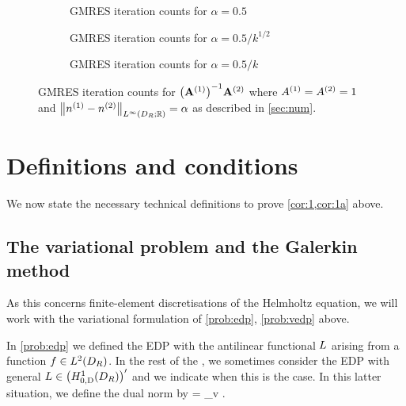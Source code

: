   \begin{figure}
    \centering
    \begin{subfigure}{\textwidth}
      \centering

\caption{GMRES iteration counts for $\alpha = 0.5$}\label{fig:linfinityn0}
    \end{subfigure}
    
    \begin{subfigure}{\textwidth}
      \centering

  \caption{GMRES iteration counts for $\alpha = 0.5/k^{1/2}$}\label{fig:linfinityn1}
\end{subfigure}

    \begin{subfigure}{\textwidth}
      \centering

  \caption{GMRES iteration counts for $\alpha = 0.5/k$}\label{fig:linfinityn2}
\end{subfigure}
\caption{GMRES iteration counts for $\AmatoI\Amatt$ where ${A}^{(1)}={A}^{(2)}=1$ and $\NLiDRRR{\nso-\nst} = \alpha$ as described in \cref{sec:num}.}
\end{figure}
  



\section{Definitions and conditions}\label{sec:3}

We now state the necessary technical definitions to prove \cref{cor:1,cor:1a} above.

\subsection{The variational problem and the Galerkin method}\label{sec:vpGm}
As this  concerns finite-element discretisations of the Helmholtz equation, we will work with the variational formulation of \cref{prob:edp}, \cref{prob:vedp} above.

In \cref{prob:edp} we defined the EDP with the antilinear functional $L$ arising from a function $f\in \LtDR$. In the rest of the , 
we sometimes consider the EDP with general $\LE\in \HozDDRp$ and we indicate when this is the case.
In this latter situation, we define the dual norm by
\beq\label{eq:dualnorm}
= \sup_{v\in \HozDDR} .
\eeq
\ere

